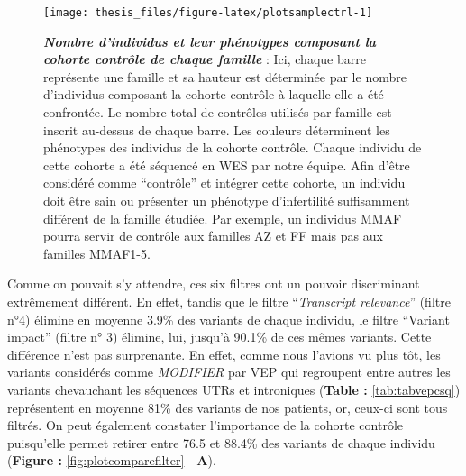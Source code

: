 \documentclass[12pt,a4paper,twoside]{ugathesis}
\begin{document}
\begin{figure}

{\centering \texttt{[image: thesis\_files/figure-latex/plotsamplectrl-1]} 

}

\caption[Nombre d'individus et leur phénotypes composant la cohorte contrôle de chaque famille]{\textbf{\emph{Nombre d'individus et leur phénotypes
composant la cohorte contrôle de chaque famille}} : Ici, chaque barre
représente une famille et sa hauteur est déterminée par le nombre
d'individus composant la cohorte contrôle à laquelle elle a été
confrontée. Le nombre total de contrôles utilisés par famille est
inscrit au-dessus de chaque barre. Les couleurs déterminent les
phénotypes des individus de la cohorte contrôle. Chaque individu de
cette cohorte a été séquencé en WES par notre équipe. Afin d'être
considéré comme ``contrôle'' et intégrer cette cohorte, un individu doit
être sain ou présenter un phénotype d'infertilité suffisamment différent
de la famille étudiée. Par exemple, un individus MMAF pourra servir de
contrôle aux familles AZ et FF mais pas aux familles MMAF1-5.}\label{fig:plotsamplectrl}
\end{figure}














\newpage

Comme on pouvait s'y attendre, ces six filtres ont un pouvoir
discriminant extrêmement différent. En effet, tandis que le filtre
``\emph{Transcript relevance}'' (filtre n°4) élimine en moyenne 3.9\%
des variants de chaque individu, le filtre ``Variant impact'' (filtre n°
3) élimine, lui, jusqu'à 90.1\% de ces mêmes variants. Cette différence
n'est pas surprenante. En effet, comme nous l'avions vu plus tôt, les
variants considérés comme \emph{MODIFIER} par VEP qui regroupent entre
autres les variants chevauchant les séquences UTRs et introniques
(\textbf{Table :} \ref{tab:tabvepcsq}) représentent en moyenne 81\% des
variants de nos patients, or, ceux-ci sont tous filtrés. On peut
également constater l'importance de la cohorte contrôle puisqu'elle
permet retirer entre 76.5 et 88.4\% des variants de chaque individu
(\textbf{Figure :} \ref{fig:plotcomparefilter} - \textbf{A}).
\end{document}

